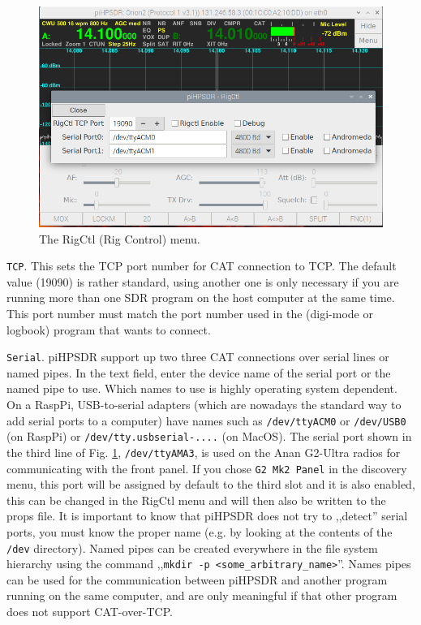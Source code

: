 \documentclass[12pt]{book}
\def\rett#1{\texttt{\color{red}#1}}
\def\pH{pi\-HPSDR\xspace}
\begin{document}
\begin{figure}[ht]
\center
\includegraphics[width=12cm]{RigCtlMenu.png}
\caption{The RigCtl (Rig Control) menu.}
\label{fig:RigCtlMenu}
\end{figure}

\rett{TCP}. This sets the TCP port number for CAT connection to TCP. The default value (19090)
is rather standard, using another one is only necessary if you are running more than one
SDR program on the host computer at the same time.
This port number must match the port number used in the (digi-mode or logbook) program that wants to connect.

\rett{Serial}. \pH support up two three CAT connections over serial lines or named pipes.
In the text field, enter the device name of the serial port or the named pipe to use.
Which names to use
is highly operating system dependent. On a RaspPi,  USB-to-serial
adapters (which are nowadays the standard way to add serial ports to a computer) have names such as
\texttt{/dev/ttyACM0} or \texttt{/dev/USB0} (on RaspPi) or \texttt{/dev/tty.usbserial-....} (on MacOS).
The serial port shown in the third line of Fig. \ref{fig:RigCtlMenu}, \texttt{/dev/ttyAMA3},
is used on the Anan G2-Ultra radios for communicating with the front panel. If you chose
\rett{G2 Mk2 Panel} in the discovery menu, this port will be assigned by default to the third
slot and it is also enabled, this can be changed in the RigCtl menu and will then also be written to
the props file.
 It is important to know that \pH does not try to ,,detect'' serial
ports, you must know the proper name (e.g. by looking at the contents of the \texttt{/dev} directory).
Named pipes can be created everywhere in the file system hierarchy using the command
,,\texttt{mkdir -p <some\_arbitrary\_name>}''. Names pipes can be used for the communication between \pH
and another program running on the same computer, and are only meaningful if that other program does not
support CAT-over-TCP.
\end{document}
